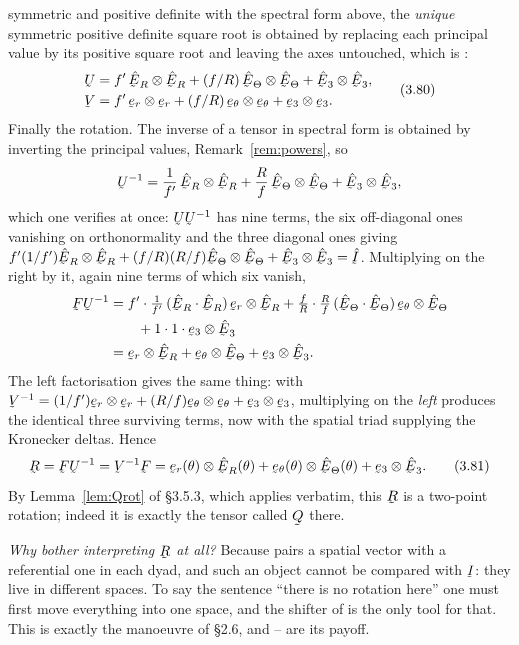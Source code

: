 symmetric and positive definite with the spectral form above, the
\emph{unique} symmetric positive definite square root is obtained by
replacing each principal value by its positive square root and leaving the
axes untouched, which is :
\begin{equation}
\begin{aligned}
   \bU&=f'\,\hER\otimes\hER+(f/R)\,\hETh\otimes\hETh
       +\hbE_{3}\otimes\hbE_{3},\\
   \bV&=f'\,\ber\otimes\ber+(f/R)\,\bet\otimes\bet+\be_{3}\otimes\be_{3}.
\end{aligned}
   \tag{3.80}\label{eq:3.80}
\end{equation}
Finally the rotation. The inverse of a tensor in spectral form is obtained
by inverting the principal values, Remark~\ref{rem:powers}, so
\[
   \bU^{-1}=\frac{1}{f'}\,\hER\otimes\hER
     +\frac{R}{f}\,\hETh\otimes\hETh+\hbE_{3}\otimes\hbE_{3},
\]
which one verifies at once: $\bU\bU^{-1}$ has nine terms, the six
off-diagonal ones vanishing on orthonormality and the three diagonal ones
giving $f'(1/f')\hER\otimes\hER+(f/R)(R/f)\hETh\otimes\hETh
+\hbE_{3}\otimes\hbE_{3}=\hI$. Multiplying  on the right by it,
again nine terms of which six vanish,
\[
\begin{aligned}
   \bF\bU^{-1}
   &=f'\cdot\tfrac{1}{f'}\,(\ip{\hER}{\hER})\,\ber\otimes\hER
    +\tfrac{f}{R}\cdot\tfrac{R}{f}\,(\ip{\hETh}{\hETh})\,\bet\otimes\hETh\\
   &\qquad+1\cdot1\cdot\be_{3}\otimes\hbE_{3}\\
   &=\ber\otimes\hER+\bet\otimes\hETh+\be_{3}\otimes\hbE_{3}.
\end{aligned}
\]
The left factorisation gives the same thing: with
$\bV^{-1}=(1/f')\ber\otimes\ber+(R/f)\bet\otimes\bet
+\be_{3}\otimes\be_{3}$, multiplying  on the \emph{left} produces
the identical three surviving terms, now with the spatial triad supplying
the Kronecker deltas. Hence
\begin{equation}
   \bR=\bF\bU^{-1}=\bV^{-1}\bF
     =\ber(\theta)\otimes\hER(\theta)+\bet(\theta)\otimes\hETh(\theta)
      +\be_{3}\otimes\hbE_{3}.
   \tag{3.81}\label{eq:3.81}
\end{equation}
By Lemma~\ref{lem:Qrot} of \S3.5.3, which applies verbatim, this $\bR$ is
a two-point rotation; indeed it is exactly the tensor called $\bQ$ there.

\emph{Why bother interpreting $\bR$ at all?} Because  pairs a
spatial vector with a referential one in each dyad, and such an object
cannot be compared with $\I$: they live in different spaces. To say the
sentence ``there is no rotation here'' one must first move everything into
one space, and the shifter of  is the only tool for that. This is
exactly the manoeuvre of \S2.6, and -- are its payoff.

